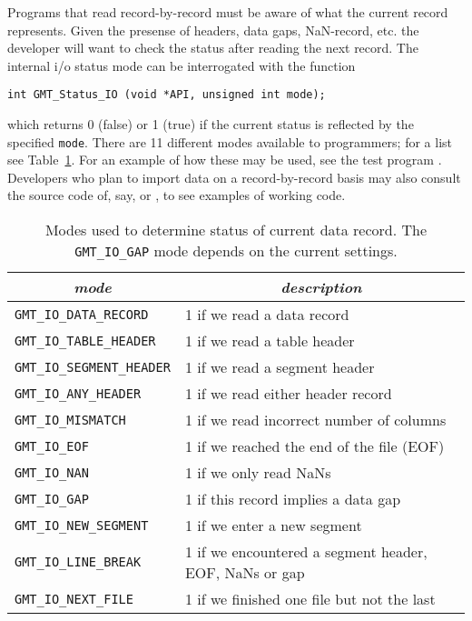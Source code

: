 \documentclass[11pt]{report}
\begin{document}
Programs that read record-by-record must be aware of what the current record represents.
Given the presense of headers, data gaps, NaN-record, etc. the developer will want to
check the status after reading the next record.  The internal i/o status mode can be
interrogated with the function

\begin{verbatim}
int GMT_Status_IO (void *API, unsigned int mode);
\end{verbatim}

which returns 0 (false) or 1 (true) if the current status is reflected by the specified \texttt{mode}.
There are 11 different modes available to programmers; for a list see Table~\ref{tbl:iostatus}.
For an example of how these may be used, see the test program .
Developers who plan to import data on a record-by-record basis may also consult the source
code of, say,  or , to see examples of working code.

\begin{table}[h]
\small
\centering
\begin{tabular}{|l|l|} \hline
\multicolumn{1}{|c|}{\emph{mode}} & \multicolumn{1}{c|}{\emph{description}} \\ \hline
\texttt{GMT\_IO\_DATA\_RECORD}	&       1 if we read a data record \\ \hline
\texttt{GMT\_IO\_TABLE\_HEADER}	&       1 if we read a table header \\ \hline
\texttt{GMT\_IO\_SEGMENT\_HEADER}	&       1 if we read a segment header \\ \hline
\texttt{GMT\_IO\_ANY\_HEADER}	&       1 if we read either header record \\ \hline
\texttt{GMT\_IO\_MISMATCH}	&       1 if we read incorrect number of columns \\ \hline
\texttt{GMT\_IO\_EOF}		&       1 if we reached the end of the file (EOF) \\ \hline
\texttt{GMT\_IO\_NAN}		&       1 if we only read NaNs \\ \hline
\texttt{GMT\_IO\_GAP}		&       1 if this record implies a data gap \\ \hline
\texttt{GMT\_IO\_NEW\_SEGMENT}	&       1 if we enter a new segment \\ \hline
\texttt{GMT\_IO\_LINE\_BREAK}	&       1 if we encountered a segment header, EOF, NaNs or gap \\ \hline
\texttt{GMT\_IO\_NEXT\_FILE}	&       1 if we finished one file but not the last \\ \hline
\end{tabular}
\caption{Modes used to determine status of current data record.  The \texttt{GMT\_IO\_GAP} mode depends on the current  settings.}
\label{tbl:iostatus}
\end{table}
\end{document}
